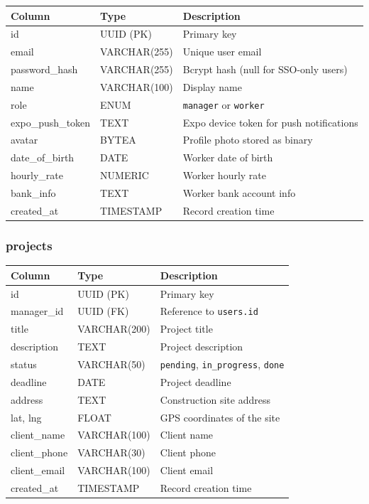 \documentclass[12pt,a4paper]{article}
\begin{document}
\begin{tabularx}{\textwidth}{llX}
\toprule
\textbf{Column} & \textbf{Type} & \textbf{Description} \\
\midrule
id            & UUID (PK)     & Primary key \\
email         & VARCHAR(255)  & Unique user email \\
password\_hash & VARCHAR(255) & Bcrypt hash (null for SSO-only users) \\
name          & VARCHAR(100)  & Display name \\
role          & ENUM          & \texttt{manager} or \texttt{worker} \\
expo\_push\_token & TEXT      & Expo device token for push notifications \\
avatar        & BYTEA         & Profile photo stored as binary \\
date\_of\_birth & DATE        & Worker date of birth \\
hourly\_rate  & NUMERIC       & Worker hourly rate \\
bank\_info    & TEXT          & Worker bank account info \\
created\_at   & TIMESTAMP     & Record creation time \\
\bottomrule
\end{tabularx}

\subsubsection{projects}

\begin{tabularx}{\textwidth}{llX}
\toprule
\textbf{Column} & \textbf{Type} & \textbf{Description} \\
\midrule
id           & UUID (PK)    & Primary key \\
manager\_id  & UUID (FK)    & Reference to \texttt{users.id} \\
title        & VARCHAR(200) & Project title \\
description  & TEXT         & Project description \\
status       & VARCHAR(50)  & \texttt{pending}, \texttt{in\_progress}, \texttt{done} \\
deadline     & DATE         & Project deadline \\
address      & TEXT         & Construction site address \\
lat, lng     & FLOAT        & GPS coordinates of the site \\
client\_name & VARCHAR(100) & Client name \\
client\_phone & VARCHAR(30) & Client phone \\
client\_email & VARCHAR(100)& Client email \\
created\_at  & TIMESTAMP    & Record creation time \\
\bottomrule
\end{tabularx}
\end{document}
